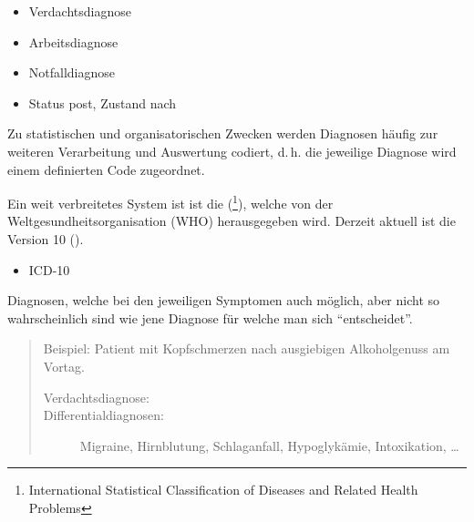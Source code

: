 {
\begin{itemize}
    \item {Verdachtsdiagnose}
    \item {Arbeitsdiagnose}
    \item {Notfalldiagnose}
    \item {Status post}, {Zustand nach}
\end{itemize}}
{}
{}
{}




{Zu statistischen und organisatorischen Zwecken werden
Diagnosen häufig zur weiteren Verarbeitung und Auswertung
codiert, d.\,h. die jeweilige Diagnose wird einem
definierten Code zugeordnet. 

Ein weit verbreitetes System
ist ist die 
(\footnote{ International Statistical
Classification of Diseases and Related Health Problems}),
welche von der Weltgesundheitsorganisation (WHO)
herausgegeben wird. Derzeit aktuell ist die Version 10
({}). 

}
{\begin{itemize}
  \item ICD-10
\end{itemize}}
{}
{}
{}

{%
Diagnosen, welche bei den jeweiligen Symptomen auch
möglich, aber nicht so wahrscheinlich sind wie jene
Diagnose für welche man sich \enquote{entscheidet}.

\begin{quote}
Beispiel: Patient mit Kopfschmerzen nach ausgiebigen
Alkoholgenuss am Vortag.
\begin{description}
    \item[Verdachtsdiagnose:] 
    \item[Differentialdiagnosen:]
    Migraine, Hirnblutung, Schlaganfall,
    Hypoglykämie, Intoxikation, \ldots
\end{description}
\end{quote}}
{}
{}
{}
{}






